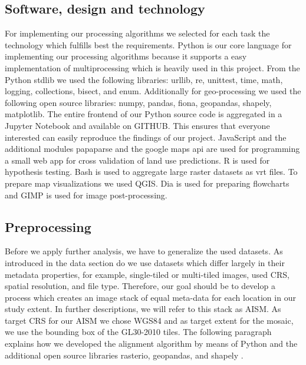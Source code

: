 	\subsection{Software, design and technology}
		For implementing our processing algorithms we selected for each task the technology which fulfills best the requirements. Python is our core language for implementing our processing algorithms because it supports a easy implementation of multiprocessing which is heavily used in this project. From the Python \ac{stdlib} we used the following libraries: urllib, re, unittest, time, math, logging, collections, bisect, and enum. Additionally for geo-processing we used the following open source libraries: numpy, pandas, fiona, geopandas, shapely, matplotlib. The entire frontend of our Python source code is aggregated in a Jupyter Notebook and available on GITHUB. This ensures that everyone interested can easily reproduce the findings of our project. JavaScript and the additional modules papaparse and the google maps api are used for programming a small web app for cross validation of land use predictions. R is used for hypothesis testing. Bash is used to aggregate large raster datasets as vrt files. To prepare map visualizations we used QGIS. Dia is used for preparing flowcharts and GIMP is used for image post-processing.

	\subsection{Preprocessing}
		Before we apply further analysis, we have to generalize the used datasets. As introduced in the data section do we use datasets which differ largely in their metadata properties, for example, single-tiled or multi-tiled images, used \ac{CRS}, spatial resolution, and file type. Therefore, our goal should be to develop a process which creates an image stack of equal meta-data for each location in our study extent. In further descriptions, we will refer to this stack as \ac{AISM}. As target \ac{CRS} for our \ac{AISM} we chose \ac{WGS84} and as target extent for the mosaic, we use the bounding box of the \ac{GL30}-2010 tiles. The following paragraph explains how we developed the alignment algorithm by means of Python and the additional open source libraries rasterio, geopandas, and shapely \citep{Rossum2018,McKinney2010}.

